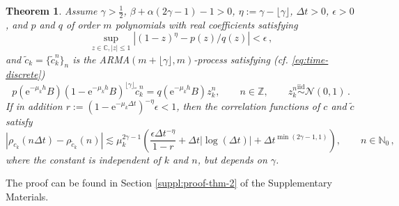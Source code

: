 \documentclass[12pt]{article} %
\newcommand{\abs}[1]{\left| #1 \right|}
\newtheorem{theorem}{Theorem}
\begin{document}
\begin{theorem} \label{thm:method-convergence} 
Assume $\gamma>\tfrac12$, $\beta + \alpha (2 \gamma - 1) - 1 > 0$, $\eta := \gamma - \lfloor \gamma \rfloor$, $\Delta t>0$, $\epsilon > 0$, and $p$ and $q$ of order $m$ polynomials with real coefficients satisfying
%
\begin{equation} \label{ass:rational-approximation}
\sup_{z \in \mathbb{C}, |z| \leq 1} \left|(1 - z)^{\eta} - p(z) / q(z) \right| < \epsilon \, ,
\end{equation}
and $\tilde{c}_k = \{\tilde{c}_k^n\}_n$ is the ARMA$(m + \lfloor \gamma \rfloor, m)$-process satisfying (cf. \eqref{eq:time-discrete})
%
\begin{equation*}
p(\mathrm{e}^{-\mu_k h } B) (1 - \mathrm{e}^{-\mu_k h } B)^{\lfloor \gamma \rfloor} \tilde{c}_k^n = q(\mathrm{e}^{-\mu_k h } B) z_k^n, \qquad n\in\mathbb Z, \qquad z_k^n\overset{\mathrm{iid}}{\sim} \mathcal{N}(0, 1) \, .
\end{equation*}
If in addition $r := (1 - \mathrm{e}^{-\mu_k \Delta t})^{-\eta} \epsilon < 1$, then the correlation functions of $c$ and $\tilde c$ satisfy %
%
\begin{equation*}
\left|\rho_{c_k}(n \Delta t) - \rho_{\tilde{c}_k}(n) \right| \lesssim 
\mu_k^{2 \gamma - 1} \left(\frac{\epsilon \Delta t^{-\eta}}{1 - r} + \Delta t \abs{\log(\Delta t)} + \Delta t^{\min(2\gamma - 1, 1)} \right),\qquad n\in \mathbb N_0 \, ,
\end{equation*}
where the constant is independent of $k$ and $n$, but depends on $\gamma$. 

\end{theorem}
The proof can be found in Section \ref{suppl:proof-thm-2} of the Supplementary Materials.
\end{document}
